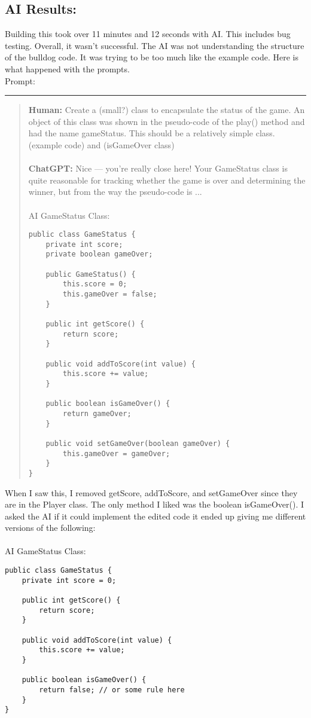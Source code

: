 \documentclass[a4paper,11pt]{article}
\begin{document}
\subsection*{AI Results:}
Building this took over 11 minutes and 12 seconds with AI. This includes bug testing. Overall, it wasn't successful. The AI was not understanding the structure of the bulldog code. It was trying to be too much like the example code. Here is what happened with the prompts.\\
Prompt:
\hrule
\vspace{4pt} %
\begin{quote}
\textbf{Human:} Create a (small?) class to encapsulate the status of the game. An object of this class was shown in the pseudo-code of the play() method and had the name gameStatus. This should be a relatively simple class. (example code) and (isGameOver class)\\\\

\textbf{ChatGPT:} Nice — you’re really close here! Your GameStatus class is quite reasonable for tracking whether the game is over and determining the winner, but from the way the pseudo-code is ... \\\\
AI GameStatus Class:
\begin{lstlisting}
public class GameStatus {
    private int score;
    private boolean gameOver;

    public GameStatus() {
        this.score = 0;
        this.gameOver = false;
    }

    public int getScore() {
        return score;
    }

    public void addToScore(int value) {
        this.score += value;
    }

    public boolean isGameOver() {
        return gameOver;
    }

    public void setGameOver(boolean gameOver) {
        this.gameOver = gameOver;
    }
}
\end{lstlisting}
\end{quote}
When I saw this, I removed getScore, addToScore, and setGameOver since they are in the Player class. The only method I liked was the boolean isGameOver(). I asked the AI if it could implement the edited code it ended up giving me different versions of the following: \\\\
AI GameStatus Class:
\begin{lstlisting}
public class GameStatus {
    private int score = 0;

    public int getScore() {
        return score;
    }

    public void addToScore(int value) {
        this.score += value;
    }

    public boolean isGameOver() {
        return false; // or some rule here
    }
}
\end{lstlisting}
\end{document}
